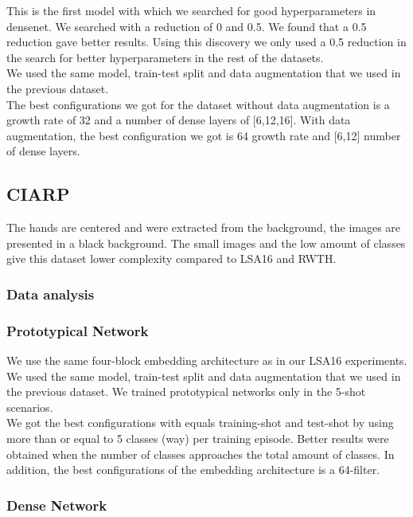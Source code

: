 \documentclass[runningheads,a4paper]{llncs}
\begin{document}
This is the first model with which we searched for good hyperparameters in densenet. We searched with a reduction of 0 and 0.5. We found that a 0.5 reduction gave better results. Using this discovery we only used a 0.5 reduction in the search for better hyperparameters in the rest of the datasets. \\

We used the same model, train-test split and data augmentation that we used in the previous dataset. \\

The best configurations we got for the dataset without data augmentation is a growth rate of 32 and a number of dense layers of [6,12,16]. With data augmentation, the best configuration we got is 64 growth rate and [6,12] number of dense layers. 

\subsection{CIARP}

The hands are centered and were extracted from the background, the images are presented in a black background.
The small images and the low amount of classes give this dataset lower complexity compared to LSA16 and RWTH.

\subsubsection{Data analysis}

\subsubsection{Prototypical Network}

We use the same four-block embedding architecture as in our LSA16 experiments. \\

We used the same model, train-test split and data augmentation that we used in the previous dataset. We trained prototypical networks only in the 5-shot scenarios. \\

We got the best configurations with equals training-shot and test-shot by using more than or equal to 5 classes (way) per training episode. Better results were obtained when the number of classes approaches the total amount of classes. In addition, the best configurations of the embedding architecture is a 64-filter.

\subsubsection{Dense Network}
\end{document}
